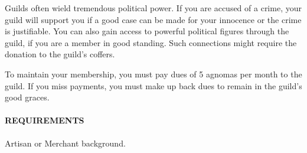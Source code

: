         Guilds often wield tremendous political power.
        If you are accused of a crime, your guild will support you if a good case can be made for your innocence or the crime is justifiable.
        You can also gain access to powerful political figures through the guild, if you are a member in good standing.
        Such connections might require the donation to the guild's coffers.

        To maintain your membership, you must pay dues of 5 agnomas per month to the guild.
        If you miss payments, you must make up back dues to remain in the guild's good graces.
        \paragraph{REQUIREMENTS} Artisan or Merchant background.

